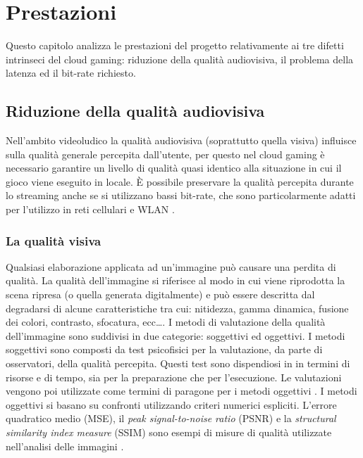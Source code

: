 %
%

\chapter{Prestazioni} \label{cap:cap4}
Questo capitolo analizza le prestazioni del progetto relativamente ai tre difetti intrinseci del cloud gaming: riduzione della qualità audiovisiva, il problema della latenza ed il bit-rate richiesto.



\section{Riduzione della qualità audiovisiva}
Nell'ambito videoludico la qualità audiovisiva (soprattutto quella visiva) influisce sulla qualità generale percepita dall'utente, per questo nel cloud gaming è necessario garantire un livello di qualità quasi identico alla situazione in cui il gioco viene eseguito in locale. È possibile preservare la qualità percepita durante lo streaming anche se si utilizzano bassi bit-rate, che sono particolarmente adatti per l'utilizzo in reti cellulari e WLAN \parencite{VideoAndMultimediaTransmissionsOverCellularNetworks}.



\subsection{La qualità visiva}
Qualsiasi elaborazione applicata ad un'immagine può causare una perdita di qualità. La qualità dell'immagine si riferisce al modo in cui viene riprodotta la scena ripresa (o quella generata digitalmente) e può essere descritta dal degradarsi di alcune caratteristiche tra cui: nitidezza, gamma dinamica, fusione dei colori, contrasto, sfocatura, ecc\dots. I metodi di valutazione della qualità dell'immagine sono suddivisi in due categorie: soggettivi ed oggettivi. I metodi soggettivi sono composti da test psicofisici per la valutazione, da parte di osservatori, della qualità percepita. Questi test sono dispendiosi in in termini di risorse e di tempo, sia per la preparazione che per l'esecuzione. Le valutazioni vengono poi utilizzate come termini di paragone per i metodi oggettivi \parencite{AnewcombinedPSNRforobjectivevideoqualityassessment}. I metodi oggettivi si basano su confronti utilizzando criteri numerici espliciti. L'errore quadratico medio (MSE), il \textit{peak signal-to-noise ratio} (PSNR) e la \textit{structural similarity index measure} (SSIM) sono esempi di misure di qualità utilizzate nell'analisi delle immagini \parencite{relationship_PSNR_and_SSI}.



